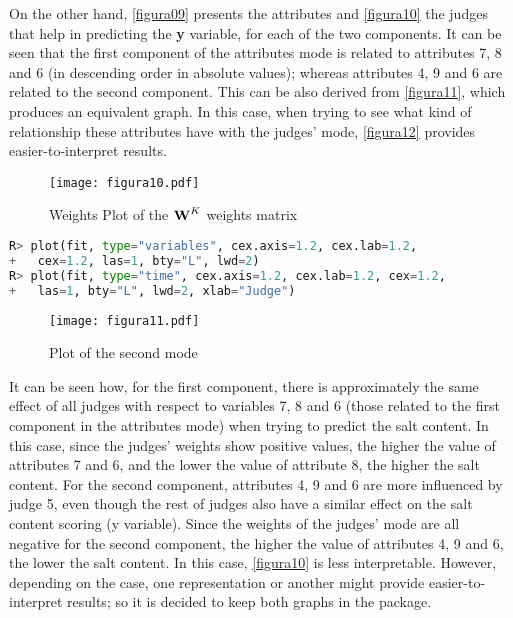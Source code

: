 On the other hand, \autoref{figura09} presents the attributes and \autoref{figura10} the judges that help in predicting the \textbf{y} variable, for each of the two components. It can be seen that the first component of the attributes mode is related to attributes 7, 8 and 6 (in descending order in absolute values); whereas attributes 4, 9 and 6 are related to the second component. This can be also derived from \autoref{figura11}, which produces an equivalent graph. In this case, when trying to see what kind of relationship these attributes have with the judges’ mode, \autoref{figura12} provides easier-to-interpret results.

\begin{figure}[!ht]
\centering
\texttt{[image: figura10.pdf]}
\caption{Weights Plot of the $\textbf{\text{W}}^{K}$ weights matrix}
\label{figura10}
\end{figure}

\vspace{15pt}
\begin{lstlisting}[basicstyle=\small, language=Python]
R> plot(fit, type="variables", cex.axis=1.2, cex.lab=1.2, 
+   cex=1.2, las=1, bty="L", lwd=2)
R> plot(fit, type="time", cex.axis=1.2, cex.lab=1.2, cex=1.2, 
+   las=1, bty="L", lwd=2, xlab="Judge")
\end{lstlisting}

\begin{figure}[!ht]
	\centering
\texttt{[image: figura11.pdf]}
\caption{Plot of the second mode}
\label{figura11}
\end{figure}

It can be seen how, for the first component, there is approximately the same effect of all judges with respect to variables 7, 8 and 6 (those related to the first component in the attributes mode) when trying to predict the salt content. In this case, since the judges’ weights show positive values, the higher the value of attributes 7 and 6, and the lower the value of attribute 8, the higher the salt content. For the second component, attributes 4, 9 and 6 are more influenced by judge 5, even though the rest of judges also have a similar effect on the salt content scoring (y variable). Since the weights of the judges’ mode are all negative for the second component, the higher the value of attributes 4, 9 and 6, the lower the salt content. In this case, \autoref{figura10} is less interpretable. However, depending on the case, one representation or another might provide easier-to-interpret results; so it is decided to keep both graphs in the package.

